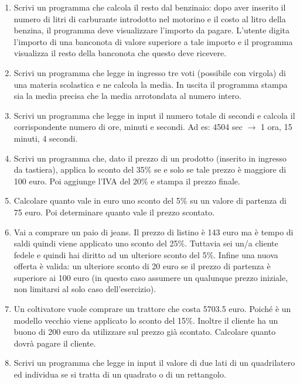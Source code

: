 \documentclass{article}
\begin{document}
\begin{enumerate}
\item Scrivi un programma che calcola il resto dal benzinaio: dopo aver inserito il numero di litri di carburante introdotto nel motorino e il costo al litro della benzina, il programma deve visualizzare l’importo da pagare. L’utente digita l’importo di una banconota di valore superiore a tale importo e il programma visualizza il resto della banconota che questo deve ricevere.

\item Scrivi un programma che legge in ingresso tre voti (possibile con virgola) di una materia scolastica e ne calcola la media. In uscita il programma stampa sia la media precisa che la media arrotondata al numero intero.

\item Scrivi un programma che legge in input il numero totale di secondi e calcola il corrispondente numero di ore, minuti e secondi. Ad es: 4504 sec $\rightarrow$ 1 ora, 15 minuti, 4 secondi.

\item Scrivi un programma che, dato il prezzo di un prodotto (inserito in ingresso da tastiera), applica lo sconto del 35\% se e solo se tale prezzo è maggiore di 100 euro. Poi aggiunge l'IVA del 20\% e stampa il prezzo finale.

\item Calcolare quanto vale in euro uno sconto del 5\% su un valore di partenza di 75 euro. Poi determinare quanto vale il prezzo scontato.

\item Vai a comprare un paio di jeans. Il prezzo di listino è 143 euro ma è tempo di saldi quindi viene applicato uno sconto del 25\%. Tuttavia sei un/a cliente fedele e quindi hai diritto ad un ulteriore sconto del 5\%. Infine una nuova offerta è valida: un ulteriore sconto di 20 euro se il prezzo di partenza è superiore ai 100 euro (in questo caso assumere un qualunque prezzo iniziale, non limitarsi al solo caso dell’esercizio).

\item Un coltivatore vuole comprare un trattore che costa 5703.5 euro. Poiché è un modello vecchio viene applicato lo sconto del 15\%. Inoltre il cliente ha un buono di 200 euro da utilizzare sul prezzo già scontato. Calcolare quanto dovrà pagare il cliente.

\item Scrivi un programma che legge in input il valore di due lati di un quadrilatero ed individua se si tratta di un quadrato o di un rettangolo.


\end{enumerate}
\end{document}
